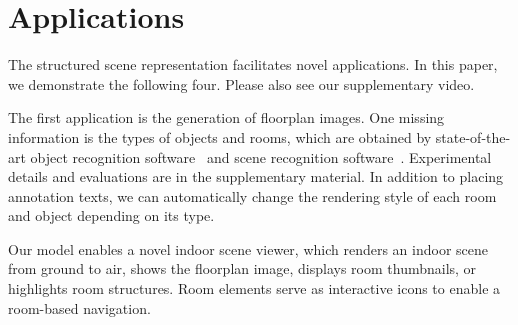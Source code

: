 \section{Applications} \label{section:applications}
The structured scene representation facilitates novel applications.  In
this paper, we demonstrate the following four.
Please also see our supplementary video.

The first application is the generation of floorplan images. One missing
information is the types of objects and rooms, which are obtained by
state-of-the-art object recognition
software~\cite{berkeley_object_detection_software} and scene recognition
software~\cite{mit_scene_demo_paper}.
Experimental details and evaluations are in the supplementary material.
In addition to placing annotation texts,
we can automatically change the rendering style of each room and object
depending on its type.

 Our model enables a
novel indoor scene viewer, which renders an indoor scene from ground to
air, shows the floorplan image, displays room thumbnails,
or highlights room structures.
Room elements serve as interactive icons to enable a room-based
navigation.

